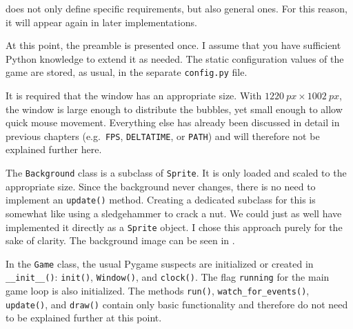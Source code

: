  does not only define specific requirements, but also general ones. For this reason, it will appear again in later implementations.

At this point, the preamble is presented once. I assume that you have sufficient Python knowledge to extend it as needed. The static configuration values of the game are stored, as usual, in the separate \texttt{config.py} file.

It is required that the window has an appropriate size. With $\SI{1220}{px} \times \SI{1002}{px}$, the window is large enough to distribute the bubbles, yet small enough to allow quick mouse movement. Everything else has already been discussed in detail in previous chapters (e.g.\ \texttt{FPS}, \texttt{DELTATIME}, or \texttt{PATH}) and will therefore not be explained further here.



The \texttt{Background} class is a subclass of \texttt{Sprite}. It is only loaded and scaled to the appropriate size. Since the background never changes, there is no need to implement an \texttt{update()} method. Creating a dedicated subclass for this is somewhat like using a sledgehammer to crack a nut. We could just as well have implemented it directly as a \texttt{Sprite} object. I chose this approach purely for the sake of clarity. The background image can be seen in .

{}

In the \texttt{Game} class, the usual Pygame suspects are initialized or created in \texttt{\_\_init\_\_()}: \texttt{init()}, \texttt{Window()}, and \texttt{clock()}. The flag \texttt{running} for the main game loop is also initialized. The methods \texttt{run()}, \texttt{watch\_for\_events()}, \texttt{up\-date()}, and \texttt{draw()} contain only basic functionality and therefore do not need to be explained further at this point.


